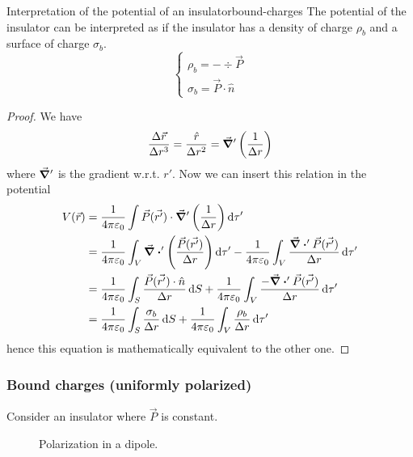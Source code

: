 \documentclass[12pt]{extarticle}
\begin{document}
\begin{proposition}{Interpretation of the potential of an insulator}{bound-charges}
	The potential of the insulator can be interpreted as if the insulator has a density of charge $\rho_b$ and a surface of charge $\sigma_b$.
	\begin{equation}
		\begin{cases}
			\rho_b = - \div \vec P \\
			\sigma_b = \vec P \cdot \hat n
		\end{cases}
	\end{equation}
\end{proposition}

\begin{proof}
	We have
	\begin{equation}
		\frac{\Delta \vec r}{\Delta r^3} = \frac{\hat{r}}{\Delta r^2} = \grad ' \left( \frac{1}{\Delta r}\right)
	\end{equation}
	where $\grad '$ is the gradient w.r.t. $r'$.
	Now we can insert this relation in the potential
	\begin{align}
		V(\vec r) & = \frac{1}{4 \pi \varepsilon_0} \int \vec P (\vec{r'}) \cdot \grad ' \left( \frac{1}{\Delta r}\right) \dd{\tau '}                                                                                    \\
		          & = \frac{1}{4 \pi \varepsilon_0} \int_V \div' \left(\frac{\vec P (\vec{r'})}{\Delta r}\right) \dd{\tau '} - \frac{1}{4 \pi \varepsilon_0} \int_V \frac{\div' \vec P (\vec{r'})}{\Delta r} \dd{\tau '} \\
		          & = \frac{1}{4 \pi \varepsilon_0} \int_S \frac{\vec P (\vec{r'}) \cdot \hat n}{\Delta r} \dd{S} + \frac{1}{4 \pi \varepsilon_0} \int_V \frac{-\div' \vec P (\vec{r'})}{\Delta r} \dd{\tau '}           \\
		          & = \frac{1}{4 \pi \varepsilon_0} \int_S \frac{\sigma_b}{\Delta r} \dd{S} + \frac{1}{4 \pi \varepsilon_0} \int_V \frac{\rho_b}{\Delta r} \dd{\tau '}
	\end{align}
	hence this equation is mathematically equivalent to the other one.
\end{proof}

\subsubsection{Bound charges (uniformly polarized)}

Consider an insulator where $\vec P$ is constant.
\begin{figure}[H]
	\centering
	
	\caption{Polarization in a dipole.}
\end{figure}
\end{document}
